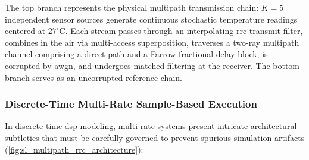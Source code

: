 \documentclass[Markos_Delaportas_1316.tex]{subfiles}
\begin{document}
The top branch represents the physical multipath transmission chain:
$K=5$ independent sensor sources generate continuous
stochastic temperature readings centered at $27^\circ\text{C}$. Each
stream passes through an interpolating \gls{rrc}
transmit filter, combines in the air via multi-access superposition,
traverses a two-ray multipath channel comprising a direct
path and a Farrow fractional delay block, is corrupted by \gls{awgn},
and undergoes matched filtering at the receiver.
The bottom branch serves as an uncorrupted reference chain.

\subsubsection{Discrete-Time Multi-Rate Sample-Based Execution}
\label{subsubsec:multirate_sample_based_dynamics}
In discrete-time \gls{dsp} modeling, multi-rate systems present
intricate architectural subtleties that must be carefully
governed to prevent spurious simulation artifacts
(\cref{fig:sl_multipath_rrc_architecture}):
\end{document}
